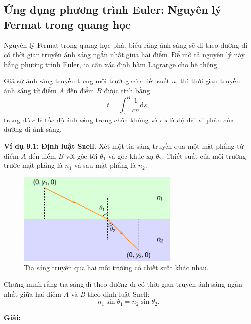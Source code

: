 \subsection{Ứng dụng phương trình Euler: Nguyên lý Fermat trong quang học}

Nguyên lý Fermat trong quang học phát biểu rằng ánh sáng sẽ đi theo đường đi có thời gian truyền ánh sáng ngắn nhất giữa hai điểm. Để mô tả nguyên lý này bằng phương trình Euler, ta cần xác định hàm Lagrange cho hệ thống.

Giả sử ánh sáng truyền trong môi trường có chiết suất \(n\), thì thời gian truyền ánh sáng từ điểm \(A\) đến điểm \(B\) được tính bằng
\begin{equation}
    t = \int_{A}^{B} \frac{1}{c n}\mathrm{d}s,
\end{equation}
trong đó \(c\) là tốc độ ánh sáng trong chân không và \(\mathrm{d}s\) là độ dài vi phân của đường đi ánh sáng.

\textbf{Ví dụ 9.1: Định luật Snell.} Xét một tia sáng truyền qua một mặt phẳng từ điểm \(A\) đến điểm \(B\) với góc tới \(\theta_1\) và góc khúc xạ \(\theta_2\). Chiết suất của môi trường trước mặt phẳng là \(n_1\) và sau mặt phẳng là \(n_2\). 

\begin{figure}[!h]
    \centering
    \includegraphics[width=0.7\textwidth]{Tuan9/Figures/Snell_law.pdf}
    \caption{Tia sáng truyền qua hai môi trường có chiết suất khác nhau.}
    \label{fig:Snell_law}
\end{figure}
Chứng minh rằng tia sáng đi theo đường đi có thời gian truyền ánh sáng ngắn nhất giữa hai điểm \(A\) và \(B\) theo định luật Snell:
\begin{equation}
    n_1 \sin \theta_1 = n_2 \sin \theta_2.
\end{equation}

\textbf{Giải:} 

